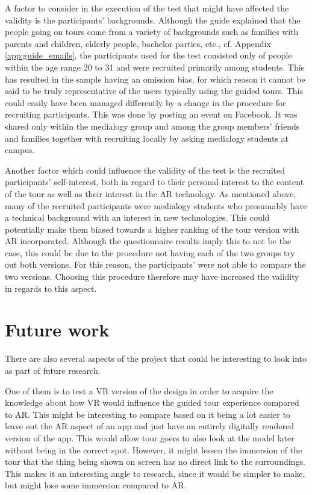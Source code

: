 A factor to consider in the execution of the test that might have affected the validity is the participants’ backgrounds. Although the guide explained that the people going on tours come from a variety of backgrounds such as families with parents and children, elderly people, bachelor parties, etc., cf. Appendix \ref{app:guide_emails}, the participants used for the test consisted only of people within the age range 20 to 31 and were recruited primarily among students. This has resulted in the sample having an omission bias, for which reason it cannot be said to be truly representative of the users typically using the guided tours. This could easily have been managed differently by a change in the procedure for recruiting participants. This was done by posting an event on Facebook. It was shared only within the medialogy group and among the group members’ friends and families together with recruiting locally by asking medialogy students at campus.

Another factor which could influence the validity of the test is the recruited participants’ self-interest, both in regard to their personal interest to the content of the tour as well as their interest in the AR technology. As mentioned above, many of the recruited participants were medialogy students who presumably have a technical background with an interest in new technologies. This could potentially make them biased towards a higher ranking of the tour version with AR incorporated. Although the questionnaire results imply this to not be the case, this could be due to the procedure not having each of the two groups try out both versions. For this reason, the participants’ were not able to compare the two versions. Choosing this procedure therefore may have increased the validity in regards to this aspect.  

\section{Future work}
There are also several aspects of the project that could be interesting to look into as part of future research. 

One of them is to test a VR version of the design in order to acquire the knowledge about how VR would influence the guided tour experience compared to AR. This might be interesting to compare based on it being a lot easier to leave out the AR aspect of an app and just have an entirely digitally rendered version of the app. This would allow tour goers to also look at the model later without being in the correct spot. However, it might lessen the immersion of the tour that the thing being shown on screen has no direct link to the surroundings. This makes it an interesting angle to research, since it would be simpler to make, but might lose some immersion compared to AR. 

